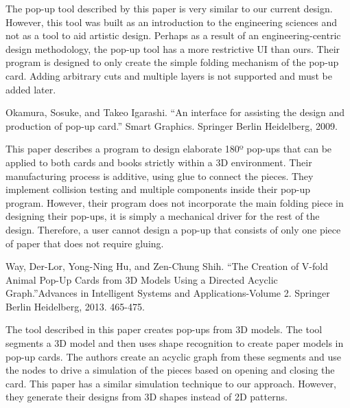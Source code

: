 The pop-up tool described by this paper is very similar to our current
design. However, this tool was built as an introduction to the
engineering sciences and not as a tool to aid artistic design. Perhaps
as a result of an engineering-centric design methodology, the pop-up
tool has a more restrictive UI than ours. Their program is designed to
only create the simple folding mechanism of the pop-up card. Adding
arbitrary cuts and multiple layers is not supported and must be added
later.

Okamura, Sosuke, and Takeo Igarashi. ``An interface for assisting the
design and production of pop-up card.'' Smart Graphics. Springer Berlin
Heidelberg, 2009. \citet{okamura2009interface}

This paper describes a program to design elaborate 180º pop-ups that can
be applied to both cards and books strictly within a 3D environment.
Their manufacturing process is additive, using glue to connect the
pieces. They implement collision testing and multiple components inside
their pop-up program. However, their program does not incorporate the
main folding piece in designing their pop-ups, it is simply a mechanical
driver for the rest of the design. Therefore, a user cannot design a
pop-up that consists of only one piece of paper that does not require
gluing.

Way, Der-Lor, Yong-Ning Hu, and Zen-Chung Shih. ``The Creation of V-fold
Animal Pop-Up Cards from 3D Models Using a Directed Acyclic
Graph.''Advances in Intelligent Systems and Applications-Volume 2.
Springer Berlin Heidelberg, 2013. 465-475. \citet{way2013creation}

The tool described in this paper creates pop-ups from 3D models. The
tool segments a 3D model and then uses shape recognition to create paper
models in pop-up cards. The authors create an acyclic graph from these
segments and use the nodes to drive a simulation of the pieces based on
opening and closing the card. This paper has a similar simulation
technique to our approach. However, they generate their designs from 3D
shapes instead of 2D patterns.
